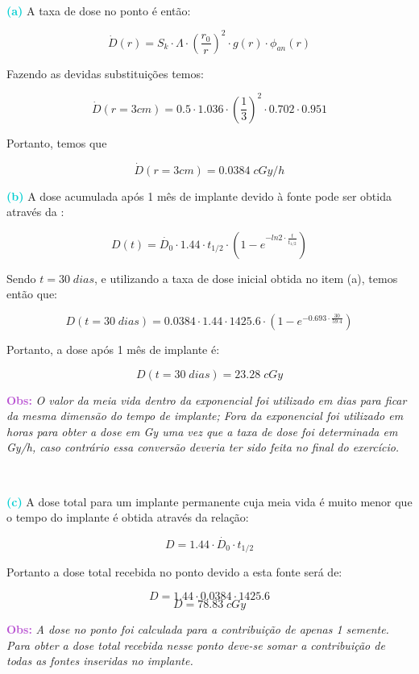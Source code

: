 \documentclass[11pt,a4paper]{article}
\newcounter{exemplo}
\begin{document}
\begin{exemplo}
				\

				\textcolor{DarkTurquoise}{\textbf{(a)}} A taxa de dose  no ponto é então:

					$$\dot{D}(r) = S_k \cdot \varLambda \cdot \left(\frac{r_0}{r}\right)^2 \cdot g(r) \cdot \phi_{an}(r)$$
				
					Fazendo as devidas substituições temos:

					$$\dot{D}(r= 3cm) = 0.5 \cdot 1.036 \cdot \left(\frac{1}{3}\right)^2 \cdot 0.702 \cdot 0.951$$

					Portanto, temos que

					$$\dot{D}(r= 3cm) = 0.0384 \; cGy / h$$

				\textcolor{DarkTurquoise}{\textbf{(b)}} A dose acumulada após 1 mês de implante devido à fonte pode ser obtida através da  :

					$$D(t) = \dot{D_0} \cdot 1.44 \cdot t_{1/2} \cdot \left(1 - e^{- ln 2 \cdot \frac{t}{t_{1/2}}}\right)$$

					Sendo $t = 30 \; dias$, e utilizando a taxa de dose inicial obtida no item (a), temos então que:

					$$D(t = 30 \; dias) = 0.0384 \cdot 1.44 \cdot 1425.6 \cdot \left(1 - e^{- 0.693 \cdot \frac{30}{59.4}}\right) $$

					Portanto, a dose após 1 mês de implante é:

					$$D(t = 30 \; dias) = 23.28 \; cGy$$

				\textbf{\textcolor{MediumOrchid}{Obs:}} \textit{O valor da meia vida dentro da exponencial foi utilizado em dias para ficar da mesma dimensão do tempo de implante; Fora da exponencial foi utilizado em horas para obter a dose em Gy uma vez que a taxa de dose foi determinada em Gy/h, caso contrário essa conversão deveria ter sido feita no final do exercício.}

				\

				\textcolor{DarkTurquoise}{\textbf{(c)}} A dose total para um implante permanente cuja meia vida é muito menor que o tempo do implante é obtida através da relação:

					$$D = 1.44 \cdot \dot{D_0} \cdot t_{1/2}$$

					Portanto a dose total recebida no ponto devido a esta fonte será de:

					$$D = 1.44 \cdot 0.0384 \cdot 1425.6$$
					$$D = 78.83 \; cGy$$

				\textbf{\textcolor{MediumOrchid}{Obs:}} \textit{ A dose no ponto foi calculada para a contribuição de apenas 1 semente. Para obter a dose total recebida nesse ponto deve-se somar a contribuição de todas as fontes inseridas no implante.}



			
		\end{exemplo}
\end{document}
